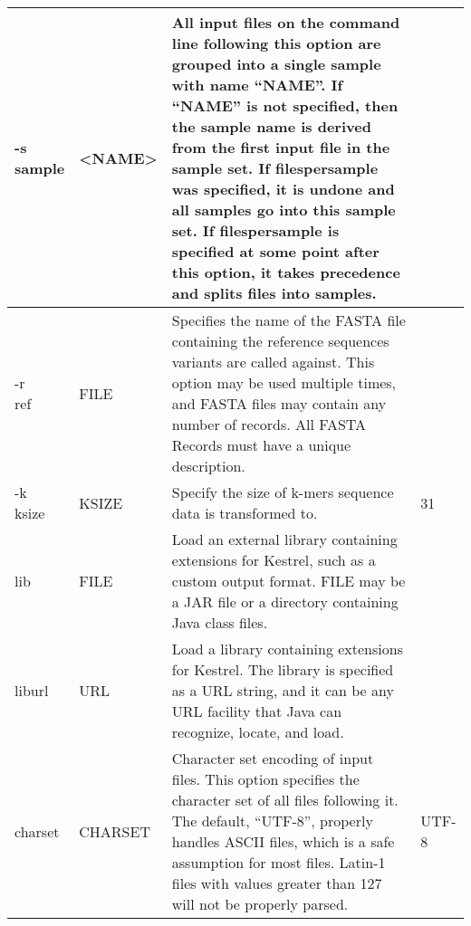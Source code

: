 \begin{small}
\begin{longtable}{|p{\optwidth}|p{\argwidth}|p{\dscwidth}|p{}|}
		\optbox{-s\\\ddash{}sample} & \textless{}NAME\textgreater &
		All input files on the command line following this option are grouped into a single sample with name ``NAME''. If ``NAME'' is not specified, then the sample name is derived from the first input file in the sample set. If \ddash{}filespersample was specified, it is undone and all samples go into this sample set. If \ddash{}filespersample is specified at some point after this option, it takes precedence and splits files into samples.
		&
		\\ \hline
		
		\optbox{-r\\\ddash{}ref} & FILE &
		Specifies the name of the FASTA file containing the reference sequences variants are called against. This option may be used multiple times, and FASTA files may contain any number of records. All FASTA Records must have a unique description.
		&
		\\ \hline
		
		\optbox{-k\\\ddash{}ksize} & KSIZE &
		Specify the size of k-mers sequence data is transformed to.
		& 31
		\\ \hline
		
		\ddash{}lib & FILE &
		Load an external library containing extensions for Kestrel, such as a custom output format. FILE may be a JAR file or a directory containing Java class files.
		&
		\\ \hline
		
		\ddash{}liburl & URL &
		Load a library containing extensions for Kestrel. The library is specified as a URL string, and it can be any URL facility that Java can recognize, locate, and load.
		&
		\\ \hline
		
		\ddash{}charset & CHARSET &
		Character set encoding of input files. This option specifies the character set of all files following it. The default, ``UTF-8'', properly handles ASCII files, which is a safe assumption for most files. Latin-1 files with values greater than 127 will not be properly parsed.
		& UTF-8
		\\ \hline
		

\end{longtable}
\end{small}

